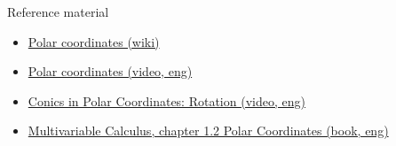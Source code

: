 \documentclass[aspectratio=169]{beamer}
\newcommand{\fbckg}[1]{\usebackgroundtemplate{\texttt{[image: \#1]}}}%
\begin{document}
\begin{frame}[t]{Reference material}
    \Large
    \begin{itemize}
        \item \href{https://en.wikipedia.org/wiki/Polar_coordinate_system}{Polar coordinates (wiki)}
        \item \href{https://youtu.be/IAb98ZgSJNw}{Polar coordinates (video, eng)}
        \item \href{https://youtu.be/me3cBMfysZs}{Conics in Polar Coordinates: Rotation (video, eng)}
        \item \href{https://www.maths.tcd.ie/~stalker/22S1/MA22S1_Chapter_1.pdf}{Multivariable Calculus, chapter 1.2 Polar Coordinates (book, eng)}
    \end{itemize}
\end{frame}

\fbckg{fibeamer/figs/last_page.png}
\frame[plain]{}
\end{document}
